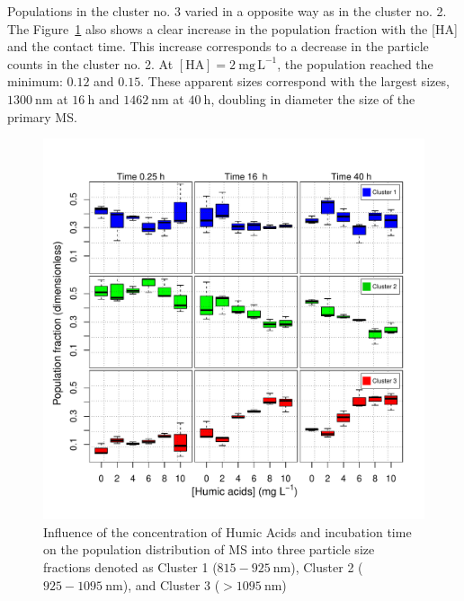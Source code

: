 \documentclass[journal=langd5,manuscript=article]{achemso}
\begin{document}
Populations in the cluster no. 3 varied in a opposite way as in the cluster no. 2. The Figure~\ref{fgr:boxplot_populations} also shows a clear increase in the population fraction with the [HA] and the contact time. This increase corresponds to a decrease in the particle counts in the cluster no. 2. At $\mathrm{[HA]} = 2~\mathrm{mg\,L^{-1}}$, the  population reached the  minimum: $0.12$  and $0.15$. These apparent sizes correspond with the largest sizes, $1300~\mathrm{nm}$ at $16~\mathrm{h}$ and $1462~\mathrm{nm}$ at $40~\mathrm{h}$, doubling in  diameter the size of the primary MS.



\begin{figure}
 \includegraphics[width=0.8\linewidth]{Figures/Boxplot_MS_HA_CaCl2_populations.pdf}
  \caption{Influence of the concentration of Humic Acids and incubation  time on the population distribution of MS into three particle size fractions denoted as
  Cluster 1 ($815 - 925~\mathrm{nm}$),  Cluster 2 ($925 - 1095~\mathrm{nm}$), 
  and
  Cluster 3 ($ > 1095~\mathrm{nm}$)
  }
  \label{fgr:boxplot_populations}
\end{figure}





\end{document}
